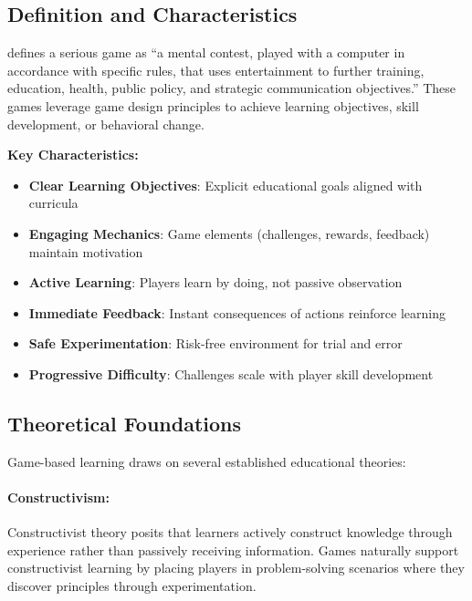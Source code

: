 \subsection{Definition and Characteristics}
\label{subsec:serious-games-definition}

\citet{zyda2005visual} defines a serious game as ``a mental contest, played with a computer in accordance with specific rules, that uses entertainment to further \textelp{} training, education, health, public policy, and strategic communication objectives.'' These games leverage game design principles to achieve learning objectives, skill development, or behavioral change.

\textbf{Key Characteristics:}
\begin{itemize}
    \item \textbf{Clear Learning Objectives}: Explicit educational goals aligned with curricula
    \item \textbf{Engaging Mechanics}: Game elements (challenges, rewards, feedback) maintain motivation
    \item \textbf{Active Learning}: Players learn by doing, not passive observation
    \item \textbf{Immediate Feedback}: Instant consequences of actions reinforce learning
    \item \textbf{Safe Experimentation}: Risk-free environment for trial and error
    \item \textbf{Progressive Difficulty}: Challenges scale with player skill development
\end{itemize}

\subsection{Theoretical Foundations}
\label{subsec:game-based-learning-theory}

Game-based learning draws on several established educational theories:

\paragraph*{Constructivism:}

Constructivist theory \citep{piaget1970genetic} posits that learners actively construct knowledge through experience rather than passively receiving information. Games naturally support constructivist learning by placing players in problem-solving scenarios where they discover principles through experimentation.


